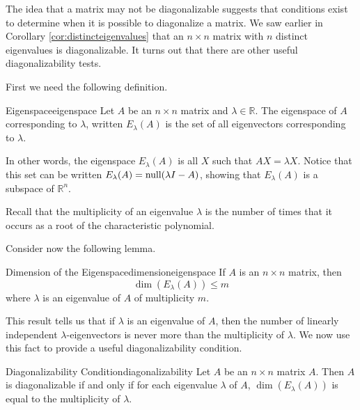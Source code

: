 The idea that a matrix may not be diagonalizable suggests that conditions exist to determine when it is possible to diagonalize a matrix. We saw earlier in Corollary \ref{cor:distincteigenvalues} that an $n \times n$ matrix with $n$ distinct eigenvalues is diagonalizable. It turns out that there are other useful diagonalizability tests. 

First we need the following definition.

\begin{definition}{Eigenspace}{eigenspace}
Let $A$ be an $n\times n$ matrix and $\lambda\in\mathbb{R}$.
The eigenspace of $A$ corresponding to $\lambda$, written $E_{\lambda}(A)$
is the set of all eigenvectors corresponding to $\lambda$. 
\end{definition}

In other words, the eigenspace $E_{\lambda}(A)$ is all $X$ such that $AX = \lambda X$. Notice that this set can be written $E_{\lambda}(A) = \mbox{null}(\lambda I - A)$, showing that $E_{\lambda}(A)$ is a subspace of $\mathbb{R}^n$. 

Recall that the multiplicity of an eigenvalue $\lambda$ is the number of times that it occurs as a root of the characteristic polynomial.

Consider now the following lemma.

\begin{lemma}{Dimension of the Eigenspace}{dimensioneigenspace}
If $A$ is an $n\times n$ matrix,  then 
\[ \dim(E_{\lambda}(A))\leq m\]
where $\lambda$ is an
eigenvalue of $A$ of multiplicity $m$.
\end{lemma}

This result tells us that if $\lambda$ is an eigenvalue of $A$, then
the number of linearly independent $\lambda$-eigenvectors
is never more than the multiplicity of $\lambda$. We now use this fact to provide a useful diagonalizability condition.

\begin{theorem}{Diagonalizability Condition}{diagonalizability}
Let $A$ be an $n \times n$ matrix $A$. Then $A$ is diagonalizable if and only if for each eigenvalue $\lambda$ of $A$, $\dim(E_{\lambda}(A))$ is equal to the multiplicity of $\lambda$.
\end{theorem}

